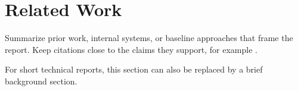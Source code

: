 \section{Related Work}

Summarize prior work, internal systems, or baseline approaches that frame the
report. Keep citations close to the claims they support, for example
\cite{knuth1984literate}.

For short technical reports, this section can also be replaced by a brief
background section.
